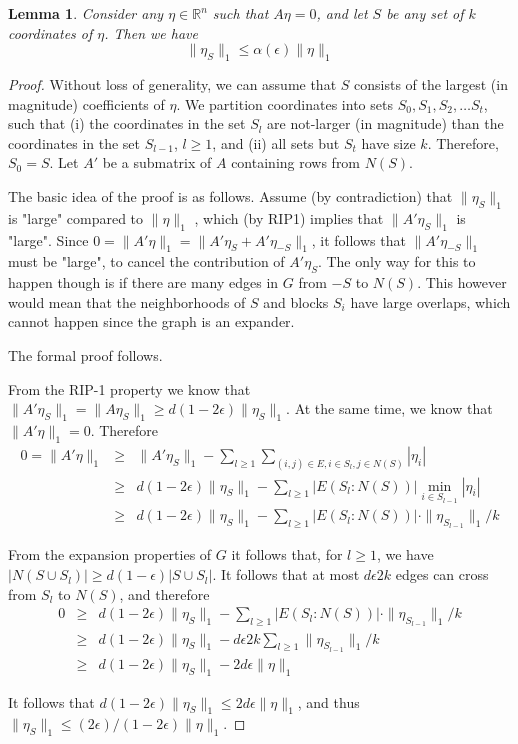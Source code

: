 \documentclass[11pt]{article}
\newcommand{\R}{\mathbb{R}}
\newtheorem{lemma}[theorem]{Lemma}
\begin{document}
\begin{lemma}
\label{l:spread}
 Consider any $\eta \in \R^n$ such that $A\eta=0$, and let $S$ be any set of $k$ coordinates of $\eta$.
Then we have
\[ \|\eta_S\|_1 \le \alpha(\epsilon) \|\eta\|_1 \]
\end{lemma}

\begin{proof}
Without loss of generality, we can assume that $S$ consists of the largest (in magnitude) coefficients of $\eta$.
We partition coordinates into sets $S_0, S_1, S_2, \ldots S_t$, such that (i)  the coordinates in the set $S_l$ are not-larger (in magnitude) than the coordinates in the set $S_{l-1}$, $l \ge 1$, and (ii) all sets but $S_t$ have size $k$.
Therefore, $S_0=S$.
Let $A'$ be a submatrix of $A$ containing rows from $N(S)$.

The basic idea of the proof is as follows. Assume (by contradiction) that $\|\eta_S\|_1$ is "large" compared to $\|\eta\|_1$ , which (by RIP1) implies that $\|A' \eta_S\|_1$ is "large". 
Since $0=\|A' \eta\|_1=\|A' \eta_{S} + A' \eta_{-S} \|_1$, it follows that $\|A' \eta_{-S} \|_1$ must be "large", to cancel the contribution of $A' \eta_S$. The only way for this to happen though is if there are many edges in $G$ from $-S$ to $N(S)$. This however would mean that the neighborhoods of $S$ and blocks $S_i$ have large overlaps, which cannot happen since the graph is an expander.

The formal proof follows.

From the RIP-1 property we know that
$\|A'\eta_S\|_1 = \|A\eta_S\|_1 \ge d (1-2\epsilon) \|\eta_S\|_1$.
At the same time, we know that $\|A' \eta\|_1 =0$.
Therefore
\begin{eqnarray*}
0 =   \|A' \eta\|_1 &  \ge &  \|A'\eta_S\|_1 - \sum_{l\ge1} \sum_{ (i,j) \in E, i \in S_l, j \in N(S)} |\eta_i| \\
& \ge &    d (1-2\epsilon) \|\eta_S\|_1- \sum_{l \ge 1}  |E(S_l:N(S))| \min_{i \in S_{l-1}} |\eta_i| \\
& \ge &   d (1-2\epsilon) \|\eta_S\|_1- \sum_{l \ge 1}  |E(S_l:N(S))| \cdot \|\eta_{S_{l-1}}\|_1/k
\end{eqnarray*}

From the expansion properties of $G$ it follows that, for $ l \ge 1$, we have
$|N(S \cup S_l)| \ge d(1-\epsilon)|S \cup S_l|$.
It follows that at most $d \epsilon 2k$ edges can cross from $S_l$ to $N(S)$, and therefore
\begin{eqnarray*}
0 & \ge & d (1-2\epsilon) \|\eta_S\|_1- \sum_{l \ge 1}  |E(S_l:N(S))| \cdot \|\eta_{S_{l-1}}\|_1/k \\
& \ge &   d (1-2\epsilon) \|\eta_S\|_1-  d \epsilon 2k \sum_{l \ge 1}  \|\eta_{S_{l-1}}\|_1/k\\
& \ge &   d (1-2\epsilon) \|\eta_S\|_1 - 2 d \epsilon \|\eta\|_1
\end{eqnarray*}

It follows that $d (1-2\epsilon) \|\eta_S\|_1 \le 2 d \epsilon \|\eta\|_1$, and thus
$\|\eta_S\|_1 \le (2 \epsilon)/(1-2\epsilon) \|\eta\|_1$.
\end{proof}
\end{document}
